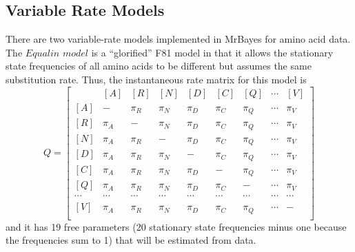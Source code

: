 \documentclass[12pt]{book}
\begin{document}
\subsection{Variable Rate Models}
There are two variable-rate models implemented in MrBayes for amino acid data. The $Equalin$
$model$ is a ``glorified'' F81 model in that it allows the stationary state frequencies of all
amino acids to be different but assumes the same substitution rate. Thus, the instantaneous rate
matrix for this model is
\[
Q=\begin{bmatrix}
    & [A] & [R] & [N] & [D] & [C] & [Q] & \cdots & [V]\\
 [A]& - & \pi_{R} & \pi_{N} & \pi_{D}& \pi_{C}& \pi_{Q} & \cdots & \pi_V\\
 [R]& \pi_{A} &- &  \pi_{N} & \pi_{D}& \pi_{C}& \pi_{Q} & \cdots & \pi_V\\
 [N]& \pi_{A} &\pi_{R} &- &   \pi_{D}& \pi_{C}& \pi_{Q} & \cdots & \pi_V\\
 [D]& \pi_{A} &\pi_{R} &  \pi_{N}&- &  \pi_{C}& \pi_{Q} & \cdots & \pi_V\\
 [C]& \pi_{A} &\pi_{R} &  \pi_{N}&  \pi_{D}&- & \pi_{Q} & \cdots & \pi_V\\
 [Q]& \pi_{A} &\pi_{R} &  \pi_{N}&  \pi_{D}& \pi_{C} &- & \cdots & \pi_V\\
 \cdots& \cdots& \cdots& \cdots& \cdots& \cdots& \cdots& \cdots& \cdots\\
 [V]& \pi_{A} &\pi_{R} &  \pi_{N}&  \pi_{D}& \pi_{C} &\pi_Q & \cdots &- \\
\end{bmatrix}
\]
and it has 19 free parameters (20 stationary state frequencies minus one because the frequencies
sum to 1) that will be estimated from data.
\end{document}
